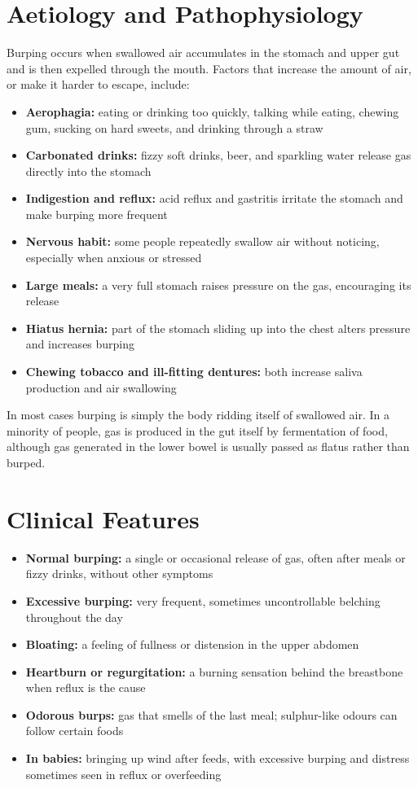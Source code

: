 \section*{Aetiology and Pathophysiology}
Burping occurs when swallowed air accumulates in the stomach and upper gut and is then expelled through the mouth. Factors that increase the amount of air, or make it harder to escape, include:
\begin{itemize}
    \item \textbf{Aerophagia:} eating or drinking too quickly, talking while eating, chewing gum, sucking on hard sweets, and drinking through a straw
    \item \textbf{Carbonated drinks:} fizzy soft drinks, beer, and sparkling water release gas directly into the stomach
    \item \textbf{Indigestion and reflux:} acid reflux and gastritis irritate the stomach and make burping more frequent
    \item \textbf{Nervous habit:} some people repeatedly swallow air without noticing, especially when anxious or stressed
    \item \textbf{Large meals:} a very full stomach raises pressure on the gas, encouraging its release
    \item \textbf{Hiatus hernia:} part of the stomach sliding up into the chest alters pressure and increases burping
    \item \textbf{Chewing tobacco and ill-fitting dentures:} both increase saliva production and air swallowing
\end{itemize}

In most cases burping is simply the body ridding itself of swallowed air. In a minority of people, gas is produced in the gut itself by fermentation of food, although gas generated in the lower bowel is usually passed as flatus rather than burped.

\section*{Clinical Features}
\begin{itemize}
    \item \textbf{Normal burping:} a single or occasional release of gas, often after meals or fizzy drinks, without other symptoms
    \item \textbf{Excessive burping:} very frequent, sometimes uncontrollable belching throughout the day
    \item \textbf{Bloating:} a feeling of fullness or distension in the upper abdomen
    \item \textbf{Heartburn or regurgitation:} a burning sensation behind the breastbone when reflux is the cause
    \item \textbf{Odorous burps:} gas that smells of the last meal; sulphur-like odours can follow certain foods
    \item \textbf{In babies:} bringing up wind after feeds, with excessive burping and distress sometimes seen in reflux or overfeeding
\end{itemize}

